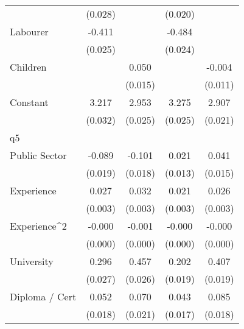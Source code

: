{\begin{tabular}{l*{4}{c}}
                    &     (0.028)         &                     &     (0.020)         &                     \\
Labourer            &      -0.411\sym{***}&                     &      -0.484\sym{***}&                     \\
                    &     (0.025)         &                     &     (0.024)         &                     \\
Children            &                     &       0.050\sym{***}&                     &      -0.004         \\
                    &                     &     (0.015)         &                     &     (0.011)         \\
Constant            &       3.217\sym{***}&       2.953\sym{***}&       3.275\sym{***}&       2.907\sym{***}\\
                    &     (0.032)         &     (0.025)         &     (0.025)         &     (0.021)         \\
\hline
q5                  &                     &                     &                     &                     \\
Public Sector       &      -0.089\sym{***}&      -0.101\sym{***}&       0.021\sym{*}  &       0.041\sym{***}\\
                    &     (0.019)         &     (0.018)         &     (0.013)         &     (0.015)         \\
Experience          &       0.027\sym{***}&       0.032\sym{***}&       0.021\sym{***}&       0.026\sym{***}\\
                    &     (0.003)         &     (0.003)         &     (0.003)         &     (0.003)         \\
Experience^{2}      &      -0.000\sym{***}&      -0.001\sym{***}&      -0.000\sym{***}&      -0.000\sym{***}\\
                    &     (0.000)         &     (0.000)         &     (0.000)         &     (0.000)         \\
University          &       0.296\sym{***}&       0.457\sym{***}&       0.202\sym{***}&       0.407\sym{***}\\
                    &     (0.027)         &     (0.026)         &     (0.019)         &     (0.019)         \\
Diploma / Cert      &       0.052\sym{***}&       0.070\sym{***}&       0.043\sym{**} &       0.085\sym{***}\\
                    &     (0.018)         &     (0.021)         &     (0.017)         &     (0.018)         \\

\end{tabular}}
